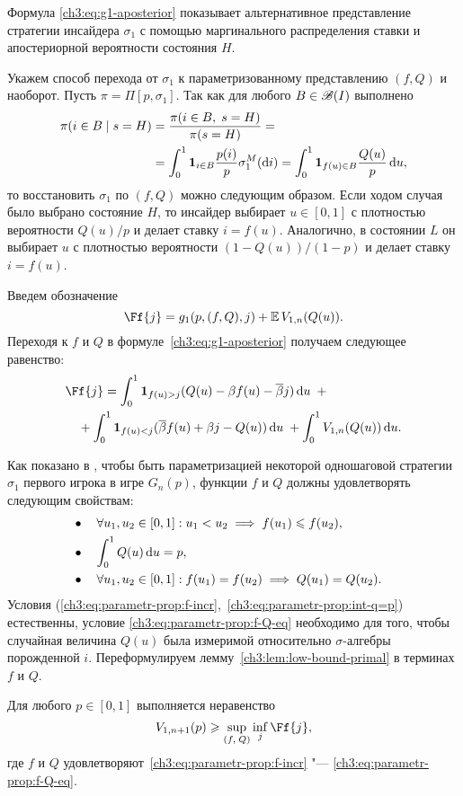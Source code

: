 {Формула \eqref{ch3:eq:g1-aposterior} показывает альтернативное представление стратегии инсайдера $\sigma_1$ с помощью маргинального распределения ставки и апостериорной вероятности состояния $H$.

Укажем способ перехода от $\sigma_1$ к параметризованному представлению $(f, Q)$ и наоборот.
Пусть $\pi = \Pi[p, \sigma_1]$.
Так как для любого $B \in \mathscr{B}(I)$ выполнено
\begin{align*}
  \pi(i \in B \; | \; s = H) 
  &= \frac{\pi(i \in B, \; s = H)}{\pi(s = H)} = \\
  &= \int_0^1 \mathbf{1}_{i \in B} \frac{p(i)}{p} \sigma^M_1(\mathop{}\!\mathrm{d} i) =
  \int_0^1 \mathbf{1}_{f(u) \in B} \frac{Q(u)}{p} \mathop{}\!\mathrm{d} u,
\end{align*}
то восстановить $\sigma_1$ по $(f, Q)$ можно следующим образом.
Если ходом случая было выбрано состояние $H$, то инсайдер выбирает $u \in [0, 1]$ с плотностью вероятности $Q(u)/p$ и делает ставку $i = f(u)$.
Аналогично, в состоянии $L$ он выбирает $u$ с плотностью вероятности $(1 - Q(u))/(1 - p)$ и делает ставку $i = f(u)$.

Введем обозначение
\[
  \Ff{j} = g_1(p, (f, Q), j) + \E V_{1,n}(Q(u)).
\]
Переходя к $f$ и $Q$ в формуле~\eqref{ch3:eq:g1-aposterior} получаем следующее равенство:
\begin{equation}\label{ch3:eq:F(f,Q,p)}
\begin{multlined}
  \Ff{j} =
  \int_0^1 \Ind{f(u) > j} (Q(u) - \Co f(u) - \DCo j) \di u \enskip + \\
  + \int_0^1 \Ind{f(u) < j} (\DCo f(u) + \Co j - Q(u)) \di u \; + \int_0^1
  V_{1,n}(Q(u)) \di u.
\end{multlined}
\end{equation}

Как показано в \cite{demeyer02}, чтобы быть параметризацией некоторой одношаговой стратегии $\sigma_1$ первого игрока в игре $G_n(p)$, функции $f$ и $Q$ должны удовлетворять следующим свойствам:
\begin{subequations}
  \begin{flalign}
    \label{ch3:eq:parametr-prop:f-incr}
    &\bullet\quad \forall u_1, u_2 \in [0, 1]: u_1 < u_2 \implies f(u_1) \leqslant f(u_2),&\\
    \label{ch3:eq:parametr-prop:int-q=p}
    &\bullet\quad \int_0^1 Q(u) \mathop{}\!\mathrm{d} u = p,&\\
    \label{ch3:eq:parametr-prop:f-Q-eq}
    &\bullet\quad \forall u_1, u_2 \in [0, 1]: f(u_1) = f(u_2) \implies Q(u_1) = Q(u_2).&
  \end{flalign}
\end{subequations}
Условия (\ref{ch3:eq:parametr-prop:f-incr},~\ref{ch3:eq:parametr-prop:int-q=p}) естественны, условие \eqref{ch3:eq:parametr-prop:f-Q-eq} необходимо для того, чтобы случайная величина $Q(u)$ была измеримой относительно $\sigma$-алгебры порожденной $i$.
Переформулируем лемму~\ref{ch3:lem:low-bound-primal} в терминах $f$ и $Q$.
\begin{lemma}
  Для любого $p \in [0, 1]$ выполняется неравенство
  \[
    V_{1,n+1}(p) \geqslant \sup_{(f, \; Q)} \inf_{j} \Ff{j},
  \]
  где $f$ и $Q$ удовлетворяют~\eqref{ch3:eq:parametr-prop:f-incr} "--- \eqref{ch3:eq:parametr-prop:f-Q-eq}.
\end{lemma}

}
